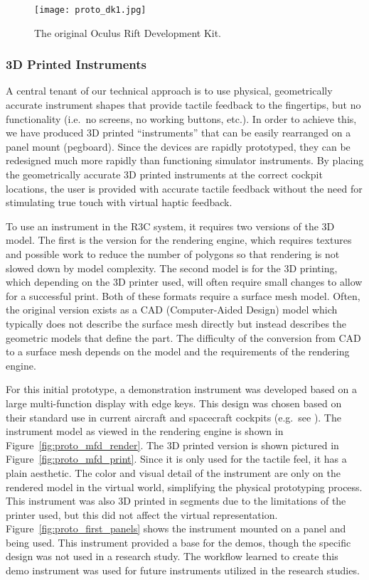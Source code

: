 \begin{figure}
    \centering
    \texttt{[image: proto\_dk1.jpg]}
    \caption{The original Oculus Rift Development Kit.}
    \label{fig:proto_oculus}
\end{figure}

\subsubsection{3D Printed Instruments}

A central tenant of our technical approach is to use physical, geometrically accurate instrument shapes that provide tactile feedback to the fingertips, but no functionality (i.e.\ no screens, no working buttons, etc.).
In order to achieve this, we have produced 3D printed ``instruments'' that can be easily rearranged on a panel mount (pegboard).
Since the devices are rapidly prototyped, they can be redesigned much more rapidly than functioning simulator instruments.
By placing the geometrically accurate 3D printed instruments at the correct cockpit locations, the user is provided with accurate tactile feedback without the need for stimulating true touch with virtual haptic feedback.

To use an instrument in the R3C system, it requires two versions of the 3D model.
The first is the version for the rendering engine, which requires textures and possible work to reduce the number of polygons so that rendering is not slowed down by model complexity.
The second model is for the 3D printing, which depending on the 3D printer used, will often require small changes to allow for a successful print.
Both of these formats require a surface mesh model.
Often, the original version exists as a CAD (Computer-Aided Design) model which typically does not describe the surface mesh directly but instead describes the geometric models that define the part.
The difficulty of the conversion from CAD to a surface mesh depends on the model and the requirements of the rendering engine.

For this initial prototype, a demonstration instrument was developed based on a large multi-function display with edge keys.
This design was chosen based on their standard use in current aircraft and spacecraft cockpits (e.g.\ see \citet{us_department_of_defense_department_1999}).
The instrument model as viewed in the rendering engine is shown in Figure~\ref{fig:proto_mfd_render}.
The 3D printed version is shown pictured in Figure~\ref{fig:proto_mfd_print}.
Since it is only used for the tactile feel, it has a plain aesthetic.
The color and visual detail of the instrument are only on the rendered model in the virtual world, simplifying the physical prototyping process.
This instrument was also 3D printed in segments due to the limitations of the printer used, but this did not affect the virtual representation.
Figure~\ref{fig:proto_first_panels} shows the instrument mounted on a panel and being used.
This instrument provided a base for the demos, though the specific design was not used in a research study.
The workflow learned to create this demo instrument was used for future instruments utilized in the research studies.


